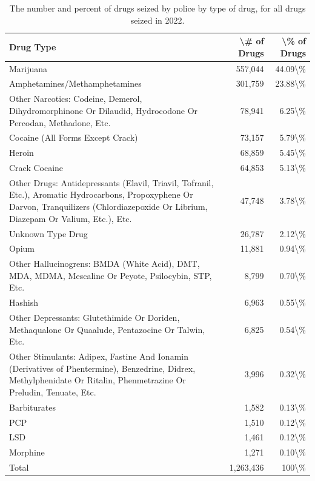 \documentclass[
  12pt,
  openany]{book}
\begin{document}
\begin{longtable}[t]{lrr}
\caption{\label{tab:propertyDrugs}The number and percent of drugs seized by police by type of drug, for all drugs seized in 2022.}\\
\toprule
Drug Type & \textbackslash{}\# of Drugs & \textbackslash{}\% of Drugs\\
\midrule
Marijuana & 557,044 & 44.09\textbackslash{}\%\\
Amphetamines/Methamphetamines & 301,759 & 23.88\textbackslash{}\%\\
Other Narcotics: Codeine, Demerol, Dihydromorphinone Or Dilaudid, Hydrocodone Or Percodan, Methadone, Etc. & 78,941 & 6.25\textbackslash{}\%\\
Cocaine (All Forms Except Crack) & 73,157 & 5.79\textbackslash{}\%\\
Heroin & 68,859 & 5.45\textbackslash{}\%\\
\addlinespace
Crack Cocaine & 64,853 & 5.13\textbackslash{}\%\\
Other Drugs: Antidepressants (Elavil, Triavil, Tofranil, Etc.), Aromatic Hydrocarbons, Propoxyphene Or Darvon, Tranquilizers (Chlordiazepoxide Or Librium, Diazepam Or Valium, Etc.), Etc. & 47,748 & 3.78\textbackslash{}\%\\
Unknown Type Drug & 26,787 & 2.12\textbackslash{}\%\\
Opium & 11,881 & 0.94\textbackslash{}\%\\
Other Hallucinogrens: BMDA (White Acid), DMT, MDA, MDMA, Mescaline Or Peyote, Psilocybin, STP, Etc. & 8,799 & 0.70\textbackslash{}\%\\
\addlinespace
Hashish & 6,963 & 0.55\textbackslash{}\%\\
Other Depressants: Glutethimide Or Doriden, Methaqualone Or Quaalude, Pentazocine Or Talwin, Etc. & 6,825 & 0.54\textbackslash{}\%\\
Other Stimulants: Adipex, Fastine And Ionamin (Derivatives of Phentermine), Benzedrine, Didrex, Methylphenidate Or Ritalin, Phenmetrazine Or Preludin, Tenuate, Etc. & 3,996 & 0.32\textbackslash{}\%\\
Barbiturates & 1,582 & 0.13\textbackslash{}\%\\
PCP & 1,510 & 0.12\textbackslash{}\%\\
\addlinespace
LSD & 1,461 & 0.12\textbackslash{}\%\\
Morphine & 1,271 & 0.10\textbackslash{}\%\\
Total & 1,263,436 & 100\textbackslash{}\%\\
\bottomrule
\end{longtable}
\end{document}
